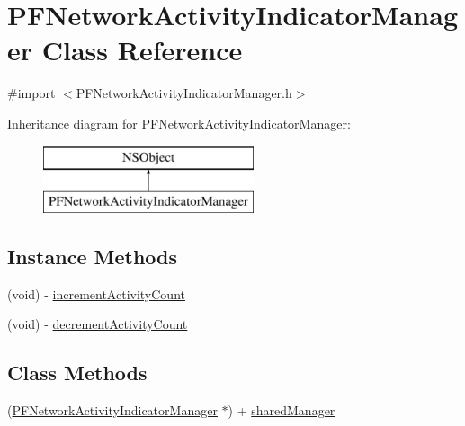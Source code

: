 \hypertarget{interface_p_f_network_activity_indicator_manager}{}\section{P\+F\+Network\+Activity\+Indicator\+Manager Class Reference}
\label{interface_p_f_network_activity_indicator_manager}


{\ttfamily \#import $<$P\+F\+Network\+Activity\+Indicator\+Manager.\+h$>$}

Inheritance diagram for P\+F\+Network\+Activity\+Indicator\+Manager\+:\begin{figure}[H]
\begin{center}
\leavevmode
\includegraphics[height=2.000000cm]{interface_p_f_network_activity_indicator_manager}
\end{center}
\end{figure}
\subsection*{Instance Methods}
\begin{DoxyCompactItemize}
\item 
(void) -\/ \hyperlink{interface_p_f_network_activity_indicator_manager_ad68cb5b671a92d5484d141ed12a9112b}{increment\+Activity\+Count}
\item 
(void) -\/ \hyperlink{interface_p_f_network_activity_indicator_manager_a76f907d87c3a142f2620b6f3467e3dd7}{decrement\+Activity\+Count}
\end{DoxyCompactItemize}
\subsection*{Class Methods}
\begin{DoxyCompactItemize}
\item 
(\hyperlink{interface_p_f_network_activity_indicator_manager}{P\+F\+Network\+Activity\+Indicator\+Manager} $\ast$) + \hyperlink{interface_p_f_network_activity_indicator_manager_afc5291681cd7f23f55aa0244c81c22d4}{shared\+Manager}
\end{DoxyCompactItemize}
